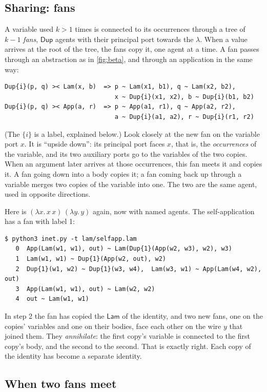\documentclass[11pt,a4paper]{article}
\newcommand{\ag}[1]{\mathsf{#1}}
\newcommand{\Dup}{\ag{Dup}}
\newcommand{\Lam}{\ag{Lam}}
\theoremstyle{definition}
\theoremstyle{plain}
\begin{document}
\subsection{Sharing: fans}

A variable used $k > 1$ times is connected to its occurrences through a tree
of $k-1$ \emph{fans}, $\Dup$ agents with their principal port towards the
$\lambda$. When a value arrives at the root of the tree, the fans copy it,
one agent at a time. A fan passes through an abstraction as in
\cref{fig:beta}, and through an application in the same way:
\begin{lstlisting}
Dup{i}(p, q) >< Lam(x, b)  => p ~ Lam(x1, b1), q ~ Lam(x2, b2),
                              x ~ Dup{i}(x1, x2), b ~ Dup{i}(b1, b2)
Dup{i}(p, q) >< App(a, r)  => p ~ App(a1, r1), q ~ App(a2, r2),
                              a ~ Dup{i}(a1, a2), r ~ Dup{i}(r1, r2)
\end{lstlisting}
(The $\{i\}$ is a label, explained below.) Look closely at the new fan on the
variable port $x$. It is ``upside down'': its principal port faces $x$, that
is, the \emph{occurrences} of the variable, and its two auxiliary ports go to
the variables of the two copies. When an argument later arrives at those
occurrences, this fan meets it and copies it. A fan going down into a body
copies it; a fan coming back up through a variable merges two copies of the
variable into one. The two are the same agent, used in opposite directions.

Here is $(\lambda x.\,x\,x)\,(\lambda y.\,y)$ again, now with named agents. The
self-application has a fan with label 1:
\begin{lstlisting}[style=trace]
$ python3 inet.py -t lam/selfapp.lam
   0  App(Lam(w1, w1), out) ~ Lam(Dup{1}(App(w2, w3), w2), w3)
   1  Lam(w1, w1) ~ Dup{1}(App(w2, out), w2)
   2  Dup{1}(w1, w2) ~ Dup{1}(w3, w4),  Lam(w3, w1) ~ App(Lam(w4, w2), out)
   3  App(Lam(w1, w1), out) ~ Lam(w2, w2)
   4  out ~ Lam(w1, w1)
\end{lstlisting}
In step 2 the fan has copied the $\Lam$ of the identity, and two new fans,
one on the copies' variables and one on their bodies, face each other on the
wire $y$ that joined them. They \emph{annihilate}: the first copy's variable
is connected to the first copy's body, and the second to the second. That is
exactly right. Each copy of the identity has become a separate identity.

\subsection{When two fans meet}\label{sec:fans}
\end{document}
